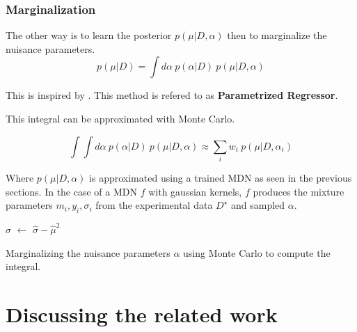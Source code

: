 \subsubsection{Marginalization} %
\label{subsub:marginalization}

The other way is to learn the posterior $p(\mu | D, \alpha)$ then to marginalize the nuisance parameters.
\begin{equation}
    p(\mu | D) = \int d\alpha ~ p(\alpha | D) ~ p(\mu | D, \alpha)
\end{equation}

This is inspired by \cite{Baldi_2016}.
This method is refered to as \textbf{Parametrized Regressor}.



This integral can be approximated with Monte Carlo.

\begin{equation}
  \int \int d\alpha ~ p(\alpha | D) ~ p(\mu | D, \alpha)
  \approx \sum_i w_i ~ p(\mu | D, \alpha_i)
\end{equation}

Where $p(\mu | D, \alpha)$ is approximated using a trained MDN as seen in the previous sections.
In the case of a MDN $f$ with gaussian kernels, $f$ produces the mixture parameters $m_i, y_i, \sigma_i$ from the experimental data $D^\star$ and sampled $\alpha$.

\begin{algorithm}[H]
$\hat\sigma$  $\gets$ $\hat\sigma - \hat\mu^2$ \;
\caption{Marginalizing the nuisance parameters $\alpha$ using Monte Carlo to compute the integral.}
\end{algorithm}







\section{Discussing the related work} %
\label{sec:discussing_the_related_work}

